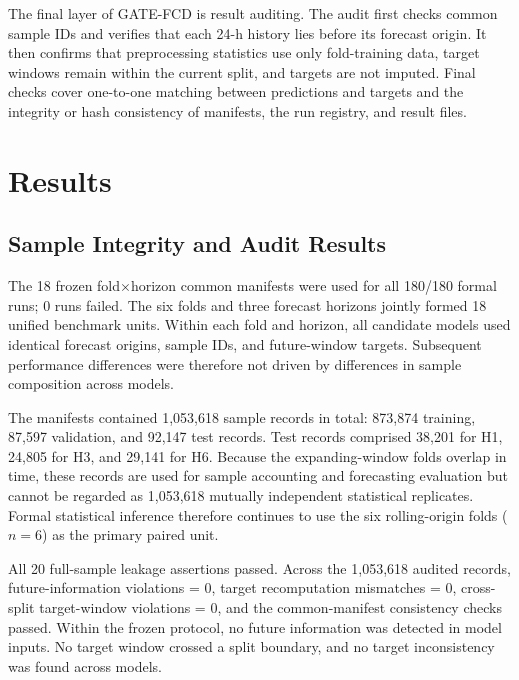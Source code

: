 \documentclass[pdflatex,sn-mathphys-num,iicol]{sn-jnl}
\begin{document}
The final layer of GATE-FCD is result auditing. The audit first checks common sample IDs and verifies that each 24-h history lies before its forecast origin. It then confirms that preprocessing statistics use only fold-training data, target windows remain within the current split, and targets are not imputed. Final checks cover one-to-one matching between predictions and targets and the integrity or hash consistency of manifests, the run registry, and result files.


\section{Results}
\label{sec:results}



\subsection{Sample Integrity and Audit Results}
\label{subsec:sample-integrity}

The 18 frozen fold$\times$horizon common manifests were used for all 180/180 formal runs; 0 runs failed. The six folds and three forecast horizons jointly formed 18 unified benchmark units. Within each fold and horizon, all candidate models used identical forecast origins, sample IDs, and future-window targets. Subsequent performance differences were therefore not driven by differences in sample composition across models.

The manifests contained 1,053,618 sample records in total: 873,874 training, 87,597 validation, and 92,147 test records. Test records comprised 38,201 for H1, 24,805 for H3, and 29,141 for H6. Because the expanding-window folds overlap in time, these records are used for sample accounting and forecasting evaluation but cannot be regarded as 1,053,618 mutually independent statistical replicates. Formal statistical inference therefore continues to use the six rolling-origin folds ($n=6$) as the primary paired unit.

All 20 full-sample leakage assertions passed. Across the 1,053,618 audited records, future-information violations = 0, target recomputation mismatches = 0, cross-split target-window violations = 0, and the common-manifest consistency checks passed. Within the frozen protocol, no future information was detected in model inputs. No target window crossed a split boundary, and no target inconsistency was found across models.
\end{document}
